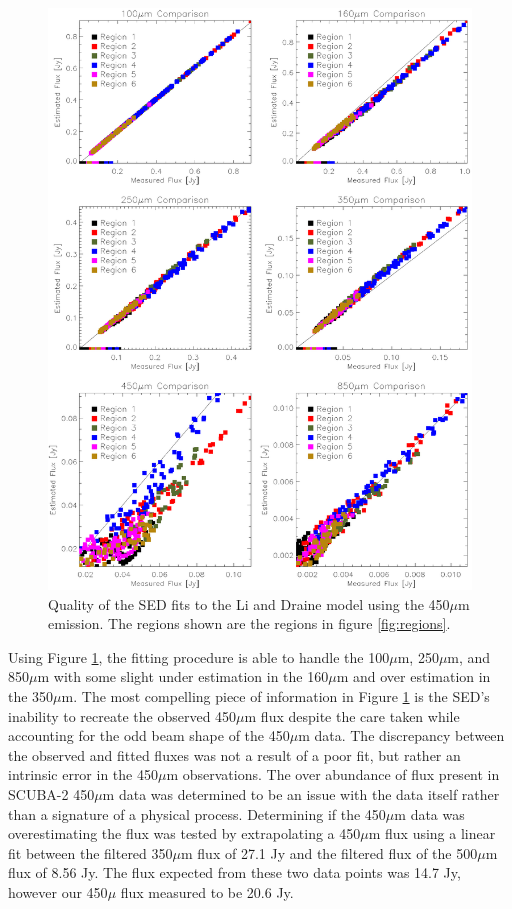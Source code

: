 \begin{figure}
  \centering
  \includegraphics[width=1.\textwidth]{sed_imgs/flux_compare_2_4.eps}
  \caption[Li and Draine Model SED Fit Quality Using 450$\mu$m Data]{Quality of the SED fits to the Li and Draine model using the 450$\mu$m emission.  The regions shown are the regions in figure \ref{fig:regions}.}
  \label{fig:w2_4}
\end{figure}

Using Figure \ref{fig:w2_4}, the fitting procedure is able to handle the 100$\mu$m, 250$\mu$m, and 850$\mu$m with some slight under estimation in the 160$\mu$m and over  estimation in the 350$\mu$m.  The most compelling piece of information in Figure \ref{fig:w2_4} is the SED's inability to recreate the observed 450$\mu$m flux despite the care taken while accounting for the odd beam shape of the 450$\mu$m data.  The discrepancy between the observed and fitted fluxes was not a result of a poor fit, but rather an intrinsic error in the 450$\mu$m observations.  The over abundance of flux present in SCUBA-2 450$\mu$m data was determined to be an issue with the data itself rather than a signature of a physical process.  Determining if the 450$\mu$m data was overestimating the flux was tested by extrapolating a 450$\mu$m flux using a linear fit between the filtered 350$\mu$m flux of 27.1 Jy and the filtered flux of the 500$\mu$m flux of 8.56 Jy.  The flux expected from these two data points was 14.7 Jy, however our 450$\mu$ flux measured to be 20.6 Jy.

